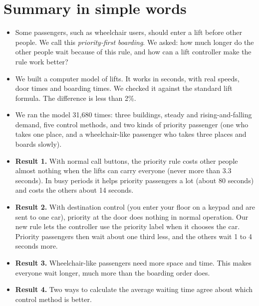 \section*{Summary in simple words}
\begin{itemize}[leftmargin=1.4em,itemsep=2pt]
\item Some passengers, such as wheelchair users, should enter a lift before other people. We call this \emph{priority-first boarding}. We asked: how much longer do the other people wait because of this rule, and how can a lift controller make the rule work better?
\item We built a computer model of lifts. It works in seconds, with real speeds, door times and boarding times. We checked it against the standard lift formula. The difference is less than 2\%.
\item We ran the model 31,680 times: three buildings, steady and rising-and-falling demand, five control methods, and two kinds of priority passenger (one who takes one place, and a wheelchair-like passenger who takes three places and boards slowly).
\item \textbf{Result 1.} With normal call buttons, the priority rule costs other people almost nothing when the lifts can carry everyone (never more than 3.3 seconds). In busy periods it helps priority passengers a lot (about 80 seconds) and costs the others about 14 seconds.
\item \textbf{Result 2.} With destination control (you enter your floor on a keypad and are sent to one car), priority at the door does nothing in normal operation. Our new rule lets the controller use the priority label when it chooses the car. Priority passengers then wait about one third less, and the others wait 1 to 4 seconds more.
\item \textbf{Result 3.} Wheelchair-like passengers need more space and time. This makes everyone wait longer, much more than the boarding order does.
\item \textbf{Result 4.} Two ways to calculate the average waiting time agree about which control method is better.
\end{itemize}

